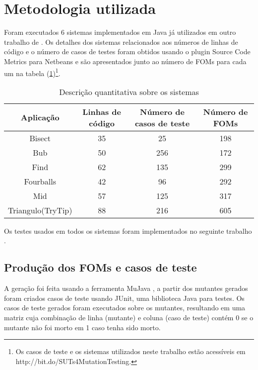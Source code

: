 \section{Metodologia utilizada}
\label{section:UsedMethodology}

Foram executados 6 sistemas implementados em Java já utilizados em outro 
trabalho de \cite{polo2009decreasing}.
Os detalhes dos sistemas  relacionados aos números de linhas de código e
o número de casos de testes foram obtidos usando o plugin Source Code 
Metrics para Netbeans \cite{sourceCodeMetrics2016} e são apresentados
junto ao número de FOMs para cada um na tabela 
(\ref{table:QuantitativeSystemDescription})\footnote{Os casos de teste
e os sistemas utilizados neste trabalho estão acessíveis em 
http://bit.do/SUTs4MutationTesting.}.

\begin{table}[h]
  \label{table:QuantitativeSystemDescription}
  \centering
  \caption{Descrição quantitativa sobre os sistemas}
  \begin{tabular}{|c|c|c|c|} \hline
    Aplicação               & Linhas de código  & Número de casos de teste     & Número de FOMs \\ \hline
    Bisect                  & 35                & 25                           & 198            \\ \hline
    Bub                     & 50                & 256                          & 172            \\ \hline
    Find                    & 62                & 135                          & 299            \\ \hline
    Fourballs               & 42                & 96                           & 292            \\ \hline
    Mid                     & 57                & 125                          & 317            \\ \hline
    Triangulo(TryTip)       & 88                & 216                          & 605            \\ \hline
  \end{tabular}
\end{table}

Os testes usados em todos os sistemas foram implementados no seguinte 
trabalho \cite{polo2009decreasing}.

\subsection{Produção dos FOMs e casos de teste}
A geração foi feita usando a ferramenta MuJava \cite{ma2005mujava}, 
a partir dos mutantes gerados foram criados casos de teste usando JUnit, 
uma biblioteca Java para testes. Os casos de teste gerados foram 
executados sobre os mutantes, resultando em uma matriz cuja combinação 
de linha (mutante) e coluna (caso de teste) contém 0 se o mutante 
não foi morto em 1 caso tenha sido morto.

